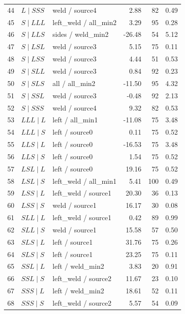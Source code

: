 \begin{longtable}{@{}r>{\raggedright\arraybackslash}p{.28\linewidth}>{\raggedright\arraybackslash}p{.27\linewidth}rrr@{}}
44 & $L\mid SSS$ & weld / source4 & 2.88 & 82 & 0.49\\
45 & $S\mid LLL$ & left\_\allowbreak weld / all\_\allowbreak min2 & 3.29 & 95 & 0.28\\
46 & $S\mid LLS$ & sides / weld\_\allowbreak min2 & -26.48 & 54 & 5.12\\
47 & $S\mid LSL$ & weld / source3 & 5.15 & 75 & 0.11\\
48 & $S\mid LSS$ & weld / source3 & 4.44 & 51 & 0.53\\
49 & $S\mid SLL$ & weld / source3 & 0.84 & 92 & 0.23\\
50 & $S\mid SLS$ & all / all\_\allowbreak min2 & -11.50 & 95 & 4.32\\
51 & $S\mid SSL$ & weld / source3 & -0.48 & 92 & 2.13\\
52 & $S\mid SSS$ & weld / source4 & 9.32 & 82 & 0.53\\
53 & $LLL\mid L$ & left / all\_\allowbreak min1 & -11.08 & 75 & 3.48\\
54 & $LLL\mid S$ & left / source0 & 0.11 & 75 & 0.52\\
55 & $LLS\mid L$ & left / source0 & -16.53 & 75 & 3.48\\
56 & $LLS\mid S$ & left / source0 & 1.54 & 75 & 0.52\\
57 & $LSL\mid L$ & left / source0 & 19.16 & 75 & 0.52\\
58 & $LSL\mid S$ & left\_\allowbreak weld / all\_\allowbreak min1 & 5.41 & 100 & 0.49\\
59 & $LSS\mid L$ & left\_\allowbreak weld / source1 & 20.30 & 36 & 0.13\\
60 & $LSS\mid S$ & weld / source1 & 16.17 & 30 & 0.08\\
61 & $SLL\mid L$ & left\_\allowbreak weld / source1 & 0.42 & 89 & 0.99\\
62 & $SLL\mid S$ & weld / source1 & 15.58 & 57 & 0.50\\
63 & $SLS\mid L$ & left / source1 & 31.76 & 75 & 0.26\\
64 & $SLS\mid S$ & left / source1 & 23.25 & 75 & 0.11\\
65 & $SSL\mid L$ & left / weld\_\allowbreak min2 & 3.83 & 20 & 0.91\\
66 & $SSL\mid S$ & left\_\allowbreak weld / source2 & 11.67 & 23 & 0.10\\
67 & $SSS\mid L$ & left / weld\_\allowbreak min2 & 18.61 & 52 & 0.11\\
68 & $SSS\mid S$ & left\_\allowbreak weld / source2 & 5.57 & 54 & 0.09\\

\end{longtable}
